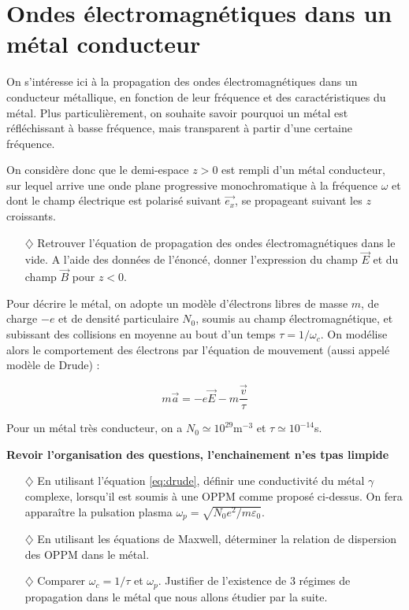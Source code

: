 \documentclass{report}
\begin{document}
\newpage

\section*{Ondes électromagnétiques dans un métal conducteur}

On s'intéresse ici à la propagation des ondes électromagnétiques dans un conducteur métallique, en fonction de leur fréquence et des caractéristiques du métal. Plus particulièrement, on souhaite savoir pourquoi un métal est réfléchissant à basse fréquence, mais transparent à partir d'une certaine fréquence.

On considère donc que le demi-espace $z>0$ est rempli d'un métal conducteur, sur lequel arrive une onde plane progressive monochromatique à la fréquence $\omega$ et dont le champ électrique est polarisé suivant $\vec{e_x}$, se propageant suivant les $z$ croissants. 

\begin{itemize}

	\item[$\diamondsuit$] Retrouver l'équation de propagation des ondes électromagnétiques dans le vide. A l'aide des données de l'énoncé, donner l'expression du champ $\vec{E}$ et du champ $\vec{B}$ pour $z<0$.

\end{itemize}

Pour décrire le métal, on adopte un modèle d'électrons libres de masse $m$, de charge $-e$ et de densité particulaire $N_0$, soumis au champ électromagnétique, et subissant des collisions en moyenne au bout d'un temps $\tau=1/\omega_c$. On modélise alors le comportement des électrons par l'équation de mouvement (aussi appelé modèle de Drude) :

\begin{equation}
	m\vec{a}=-e\vec{E}-m\frac{\vec{v}}{\tau}
	\label{eq:drude}
\end{equation}

Pour un métal très conducteur, on a $N_0\simeq10^{29}$m$^{-3}$ et $\tau\simeq10^{-14}$s.

\textbf{Revoir l'organisation des questions, l'enchainement n'es tpas limpide}

\begin{itemize}

	\item[$\diamondsuit$] En utilisant l'équation \ref{eq:drude}, définir une conductivité du métal $\gamma$ complexe, lorsqu'il est soumis à une OPPM comme proposé ci-dessus. On fera apparaître la pulsation plasma $\omega_p=\sqrt{N_0e^2/m\varepsilon_0}$. 
	
	\item[$\diamondsuit$] En utilisant les équations de Maxwell, déterminer la relation de dispersion des OPPM dans le métal. 
	
	\item[$\diamondsuit$] Comparer $\omega_c=1/\tau$ et $\omega_p$. Justifier de l'existence de 3 régimes de propagation dans le métal que nous allons étudier par la suite.

\end{itemize}
\end{document}
